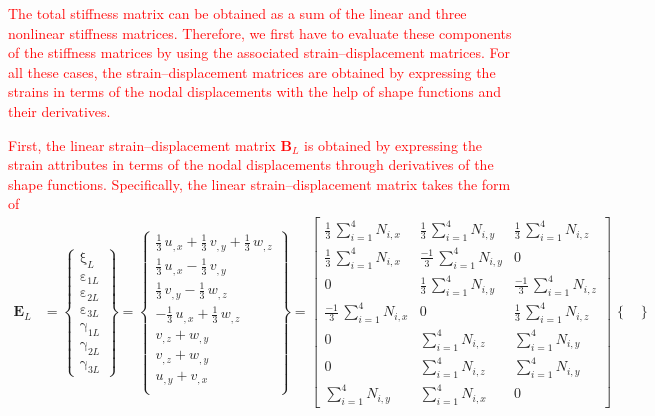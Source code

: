 \textcolor{red}{The total stiffness matrix can be obtained as a sum of the linear and three nonlinear stiffness matrices. Therefore, we first have to evaluate these components of the stiffness matrices by using the associated strain--displacement matrices. For all these cases, the strain--displacement matrices are obtained by expressing the strains in terms of the nodal displacements with the help of shape functions and their derivatives.}

\textcolor{red}{First, the linear strain--displacement matrix $\mathbf{B}_L$ is obtained by expressing the strain attributes in terms of the nodal displacements through derivatives of the shape functions. Specifically, the linear strain--displacement matrix takes the form of}
\begin{equation}
\begin{aligned}
\mathbf{E}_L & =  \begin{Bmatrix}
\mathrm \xi_{L} \\
\mathrm \varepsilon_{1L} \\
\mathrm \varepsilon_{2L} \\
\mathrm \varepsilon_{3L} \\
\mathrm \gamma_{1L} \\
\mathrm \gamma_{2L} \\
\mathrm \gamma_{3L}\end{Bmatrix} = 
\begin{Bmatrix}
\tfrac{1}{3} \, u_{,x} + \tfrac{1}{3} \, v_{,y} + \tfrac{1}{3} \, w_{,z} \\
\tfrac{1}{3} \, u_{,x} - \tfrac{1}{3} \, v_{,y} \\
\tfrac{1}{3} \, v_{,y} - \tfrac{1}{3} \, w_{,z} \\
- \tfrac{1}{3} \, u_{,x} + \tfrac{1}{3} \, w_{,z} \\ 
v_{,z} +  w_{,y} \\ 
v_{,z} +  w_{,y} \\ 
u_{,y} +  v_{,x} \\\end{Bmatrix} = \begin{bmatrix}
\tfrac{1}{3} \, \sum\nolimits_{i=1}^4 N_{i,x}  & \tfrac{1}{3} \, \sum\nolimits_{i=1}^4 N_{i,y} & \tfrac{1}{3} \, \sum\nolimits_{i=1}^4 N_{i,z} \\
\tfrac{1}{3} \, \sum\nolimits_{i=1}^4 N_{i,x}  & \tfrac{-1}{3} \, \sum\nolimits_{i=1}^4 N_{i,y} & 0 \\ 0 & \tfrac{1}{3} \, \sum\nolimits_{i=1}^4 N_{i,y}  &  \tfrac{-1}{3} \, \sum\nolimits_{i=1}^4 N_{i,z} \\  \tfrac{-1}{3} \, \sum\nolimits_{i=1}^4 N_{i,x}  & 0 & \tfrac{1}{3} \, \sum\nolimits_{i=1}^4 N_{i,z} \\ 0 & \sum\nolimits_{i=1}^4 N_{i,z}  &  \sum\nolimits_{i=1}^4 N_{i,y} \\ 0 & \sum\nolimits_{i=1}^4 N_{i,z}  &  \sum\nolimits_{i=1}^4 N_{i,y} \\ \sum\nolimits_{i=1}^4 N_{i,y}  &  \sum\nolimits_{i=1}^4 N_{i,x} & 0 \end{bmatrix} \, \begin{Bmatrix}

\end{Bmatrix}
\end{aligned}
\end{equation}
